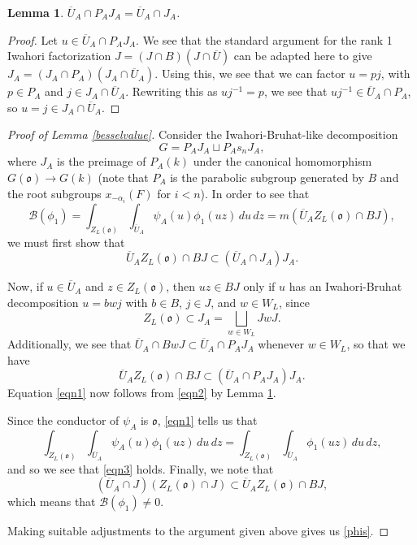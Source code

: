 \documentclass[11pt,letterpaper]{article}
\newcommand{\calB}{\mathcal{B}}
\newcommand{\goth}{\mathfrak}
\newtheorem{Lemma}[Theorem]{Lemma}
\theoremstyle{remark}
\numberwithin{equation}{section}
\begin{document}

\begin{Lemma}\label{blockiwahori}
$\overline{U}_A \cap P_AJ_A = \overline{U}_A \cap J_A$.
\end{Lemma}
\begin{proof}
Let $u \in \overline{U}_A \cap P_AJ_A$. We see that the standard argument for the rank 1 Iwahori factorization $J = (J\cap B)(J\cap \overline{U})$ can be adapted here to give $J_A = (J_A \cap P_A)(J_A \cap \overline{U}_A)$. Using this, we see that we can factor $u = pj$, with $p \in P_A$ and $j \in J_A \cap \overline{U}_A$. Rewriting this as $uj^{-1} = p$, we see that $uj^{-1} \in \overline{U}_A \cap P_A$, so $u = j \in J_A\cap \overline{U}_A$.
\end{proof}

\begin{proof}[Proof of Lemma \ref{besselvalue}]
Consider the Iwahori-Bruhat-like decomposition $$G = P_AJ_A \sqcup P_As_nJ_A,$$ where $J_A$ is the preimage of $P_A(k)$ under the canonical homomorphism $G(\goth{o}) \to G(k)$ (note that $P_A$ is the parabolic subgroup generated by $B$ and the root subgroups $x_{-\alpha_i}(F)$ for $i < n$). In order to see that \begin{equation} \label{eqn3} \calB(\phi_1) = \int_{Z_L(\goth{o})} \int_{\overline{U}_A} \psi_A(u) \phi_1(uz) \,du\,dz = m(\overline{U}_AZ_L(\goth{o}) \cap BJ),\end{equation} we must first show that \begin{equation}\label{eqn1} \overline{U}_AZ_L(\goth{o}) \cap BJ \subset (\overline{U}_A \cap J_A)J_A. \end{equation} 

Now, if $u \in \overline{U}_A$ and $z \in Z_L(\goth{o})$, then $uz \in BJ$ only if $u$ has an Iwahori-Bruhat decomposition $u = bwj$ with $b \in B$, $j \in J$, and $w \in W_L$, since \begin{equation} Z_L(\goth{o}) \subset J_A = \bigsqcup_{w\in W_L} JwJ .\end{equation} Additionally, we see that $\overline{U}_A \cap BwJ \subset \overline{U}_A\cap P_AJ_A$ whenever $w \in W_L$, so that we have \begin{equation} \label{eqn2} \overline{U}_AZ_L(\goth{o}) \cap BJ \subset (\overline{U}_A \cap P_AJ_A)J_A. \end{equation} Equation \eqref{eqn1} now follows from \eqref{eqn2} by Lemma \ref{blockiwahori}.

Since the conductor of $\psi_A$ is $\goth{o}$, \eqref{eqn1} tells us that \begin{equation} \int_{Z_L(\goth{o})} \int_{\overline{U}_A} \psi_A(u) \phi_1(uz) \,du\,dz = \int_{Z_L(\goth{o})} \int_{\overline{U}_A} \phi_1(uz) \,du\,dz,\end{equation} and so we see that \eqref{eqn3} holds. Finally, we note that $$(\overline{U}_A \cap J)(Z_L(\goth{o}) \cap J) \subset \overline{U}_AZ_L(\goth{o}) \cap BJ,$$ which means that $\calB(\phi_1) \neq 0$.

Making suitable adjustments to the argument given above gives us \eqref{phis}.
\end{proof}
\end{document}
